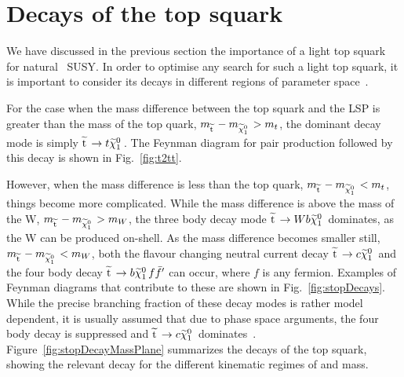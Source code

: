

\section{Decays of the top squark}

We have discussed in the previous section the importance of a light top squark for natural ~\ac{SUSY}. 
In order to optimise any search for such a light top squark, it is important to consider its decays in different regions of parameter space~\cite{CompSUSY7,CompSUSY8}.

For the case when the mass difference between the top squark and the \ac{LSP} is greater than the mass of the top quark, 
$m_{\widetilde{{\rm t}}\,} - m_{\widetilde{\chi}^{0}_{1}\,} > m_{t}$, 
the dominant decay mode is simply 
$\widetilde{{\rm t}}\, \rightarrow t \widetilde{\chi}^{0}_{1}\,$.
The Feynman diagram for \sTop pair production followed by this decay is shown in Fig.~\ref{fig:t2tt}.

However, when the mass difference is less than the top quark, 
$m_{\widetilde{{\rm t}}\,} - m_{\widetilde{\chi}^{0}_{1}\,} < m_{t}$, 
things become more complicated. 
While the mass difference is above the mass of the W, 
$m_{\widetilde{{\rm t}}\,} - m_{\widetilde{\chi}^{0}_{1}\,} > m_{W}$, 
the three body decay mode $\widetilde{{\rm t}}\, \rightarrow W b \widetilde{\chi}^{0}_{1}\,$ dominates, as the W can be produced on-shell.
As the mass difference becomes smaller still, 
$m_{\widetilde{{\rm t}}\,} - m_{\widetilde{\chi}^{0}_{1}\,} < m_{W}$,
both the flavour changing neutral current decay 
$\widetilde{{\rm t}}\, \rightarrow c \widetilde{\chi}^{0}_{1}\,$ 
and the four body decay 
$\widetilde{{\rm t}}\, \rightarrow b \widetilde{\chi}^{0}_{1}\, f \bar{f}'$ can occur, where $f$ is any fermion.
Examples of Feynman diagrams that contribute to these are shown in Fig.~\ref{fig:stopDecays}.
While the precise branching fraction of these decay modes is rather model dependent, it is usually assumed that due to phase space arguments, the four body decay is suppressed and $\widetilde{{\rm t}}\, \rightarrow c \widetilde{\chi}^{0}_{1}\,$ dominates~\cite{CompSUSY7}.
Figure~\ref{fig:stopDecayMassPlane} summarizes the decays of the top squark, showing the relevant decay for the different kinematic regimes of \sTop and \chiOneZero mass.

